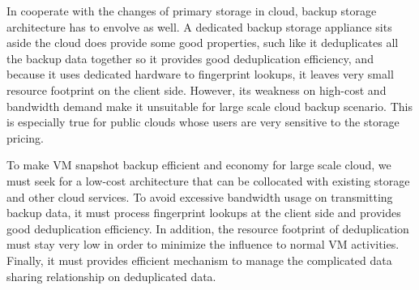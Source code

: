 In cooperate with the changes of primary storage in cloud, backup storage architecture
has to envolve as well. A dedicated backup storage appliance sits aside the cloud does provide some good properties,
such like it deduplicates all the backup data together so it provides good deduplication efficiency,
 and because it uses dedicated hardware to fingerprint lookups, it leaves very small resource footprint on the client side.
However, its weakness on high-cost and bandwidth demand make it unsuitable for large scale cloud
backup scenario. This is especially true for public clouds whose users are very sensitive
to the storage pricing. 

To make VM snapshot backup efficient and economy for large scale cloud, 
we must seek for a low-cost architecture that can be collocated with existing
storage and other cloud services. To avoid excessive bandwidth usage on transmitting 
backup data, it must process fingerprint lookups at the client side and provides
good deduplication efficiency. In addition, the resource footprint of deduplication must stay
very low in order to minimize the influence to normal VM activities. Finally, it must provides
efficient mechanism to manage the complicated data sharing relationship on deduplicated data.




